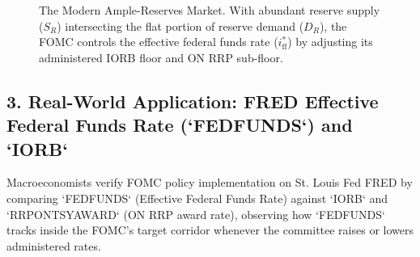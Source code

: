 \documentclass[11pt,letterpaper]{article}
\begin{document}
\begin{figure}[htbp]
\centering
{}
\caption{The Modern Ample-Reserves Market. With abundant reserve supply ($S_R$) intersecting the flat portion of reserve demand ($D_R$), the FOMC controls the effective federal funds rate ($i_{\text{ff}}^*$) by adjusting its administered IORB floor and ON RRP sub-floor.}
\label{fig:ample_reserves_market}
\end{figure}

\subsection*{3. Real-World Application: FRED Effective Federal Funds Rate (`FEDFUNDS`) and `IORB`}
Macroeconomists verify FOMC policy implementation on St. Louis Fed FRED by comparing `FEDFUNDS` (Effective Federal Funds Rate) against `IORB` and `RRPONTSYAWARD` (ON RRP award rate), observing how `FEDFUNDS` tracks inside the FOMC's target corridor whenever the committee raises or lowers administered rates.
\end{document}
